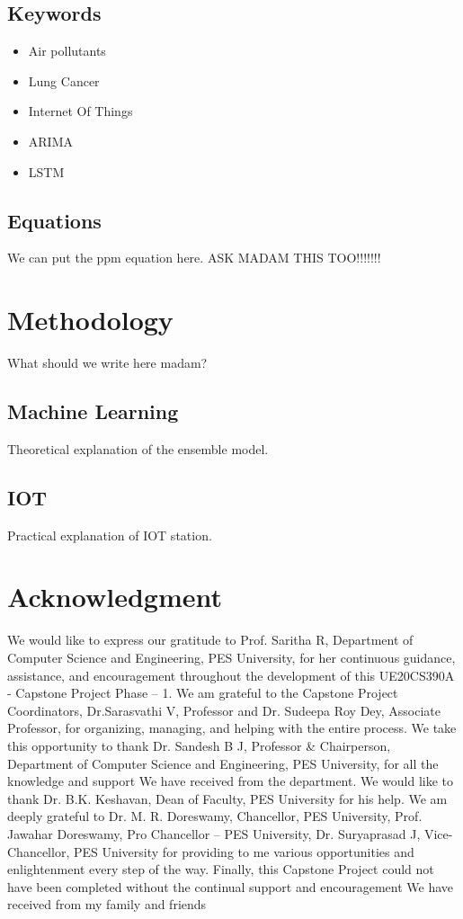 \documentclass[conference]{IEEEtran}
\begin{document}
\subsection{Keywords}
\begin{itemize}
\item Air pollutants
\item Lung Cancer
\item Internet Of Things
\item ARIMA
\item LSTM

\end{itemize}

\subsection{Equations}
We can put the ppm equation here.
ASK MADAM THIS TOO!!!!!!!

\section{Methodology}
What should we write here madam?
\subsection{Machine Learning}
Theoretical explanation of the ensemble model.
\subsection{IOT}
Practical explanation of IOT station.
\section*{Acknowledgment}

We would like to express our gratitude to Prof. Saritha R, Department of Computer Science
and Engineering, PES University, for her continuous guidance, assistance, and
encouragement throughout the development of this UE20CS390A - Capstone Project
Phase – 1.
We am grateful to the Capstone Project Coordinators, Dr.Sarasvathi V, Professor and Dr.
Sudeepa Roy Dey, Associate Professor, for organizing, managing, and helping with the
entire process.
We take this opportunity to thank Dr. Sandesh B J, Professor \& Chairperson, Department
of Computer Science and Engineering, PES University, for all the knowledge and
support We have received from the department. We would like to thank Dr. B.K. Keshavan,
Dean of Faculty, PES University for his help.
We am deeply grateful to Dr. M. R. Doreswamy, Chancellor, PES University, Prof.
Jawahar Doreswamy, Pro Chancellor – PES University, Dr. Suryaprasad J,
Vice-Chancellor, PES University for providing to me various opportunities and
enlightenment every step of the way. Finally, this Capstone Project could not have been
completed without the continual support and encouragement We have received from my
family and friends
\end{document}
